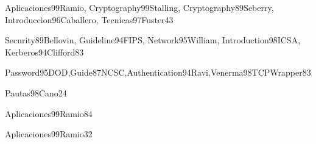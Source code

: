 \begin{syllabus}
\begin{unit}{\ALCryptographicAlgorithmsDef}{Aplicaciones99Ramio, Cryptography99Stalling, Cryptography89Seberry, Introduccion96Caballero, Tecnicas97Fuster}{4}{3}
    \ALCryptographicAlgorithmsAllTopics
    \ALCryptographicAlgorithmsAllObjectives
\end{unit}

\begin{unit}{\NCNetworkSecurityDef}{Security89Bellovin, Guideline94FIPS, Network95William, Introduction98ICSA, Kerberos94Clifford}{8}{3}
    \NCNetworkSecurityAllTopics
    \NCNetworkSecurityAllObjectives
\end{unit}

\begin{unit}{\NCNetworkManagementDef}{Password95DOD,Guide87NCSC,Authentication94Ravi,Venerma98TCPWrapper}{8}{3}
    \NCNetworkManagementAllTopics
    \NCNetworkManagementAllObjectives
\end{unit}

\begin{unit}{\HCHumanFactorsAndSecurityDef}{Pautas98Cano}{2}{4}
    \HCHumanFactorsAndSecurityAllTopics
    \HCHumanFactorsAndSecurityAllObjectives
\end{unit}

\begin{unit}{\SPSecurityOperationsDef}{Aplicaciones99Ramio}{8}{4}
    \SPSecurityOperationsAllTopics
    \SPSecurityOperationsAllObjectives
\end{unit}

\begin{unit}{\PLVirtualMachinesDef}{Aplicaciones99Ramio}{3}{2}
\begin{topics}
    \item \PLVirtualMachinesTopicSecurity
\end{topics}

\begin{learningoutcomes}
    \item \PLVirtualMachinesObjFOUR
\end{learningoutcomes}
\end{unit}



\begin{coursebibliography}
\end{coursebibliography}

\end{syllabus}
